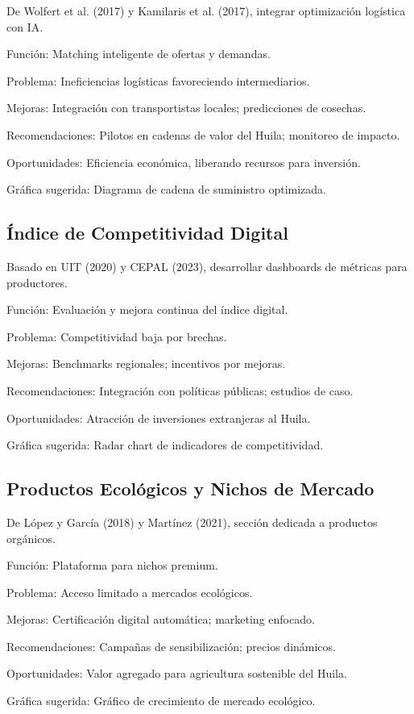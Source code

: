 De Wolfert et al. (2017) y Kamilaris et al. (2017), integrar optimización logística con IA.

Función: Matching inteligente de ofertas y demandas.

Problema: Ineficiencias logísticas favoreciendo intermediarios.

Mejoras: Integración con transportistas locales; predicciones de cosechas.

Recomendaciones: Pilotos en cadenas de valor del Huila; monitoreo de impacto.

Oportunidades: Eficiencia económica, liberando recursos para inversión.

Gráfica sugerida: Diagrama de cadena de suministro optimizada.

\subsection{Índice de Competitividad Digital}

Basado en UIT (2020) y CEPAL (2023), desarrollar dashboards de métricas para productores.

Función: Evaluación y mejora continua del índice digital.

Problema: Competitividad baja por brechas.

Mejoras: Benchmarks regionales; incentivos por mejoras.

Recomendaciones: Integración con políticas públicas; estudios de caso.

Oportunidades: Atracción de inversiones extranjeras al Huila.

Gráfica sugerida: Radar chart de indicadores de competitividad.

\subsection{Productos Ecológicos y Nichos de Mercado}

De López y García (2018) y Martínez (2021), sección dedicada a productos orgánicos.

Función: Plataforma para nichos premium.

Problema: Acceso limitado a mercados ecológicos.

Mejoras: Certificación digital automática; marketing enfocado.

Recomendaciones: Campañas de sensibilización; precios dinámicos.

Oportunidades: Valor agregado para agricultura sostenible del Huila.

Gráfica sugerida: Gráfico de crecimiento de mercado ecológico.